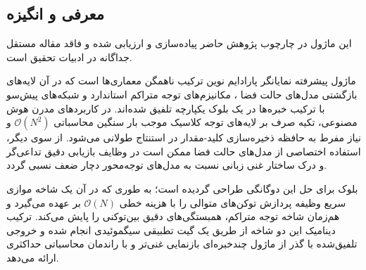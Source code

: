 \subsection{معرفی و انگیزه}
این ماژول در چارچوب پژوهش حاضر پیاده‌سازی و ارزیابی شده و فاقد مقاله مستقل جداگانه در ادبیات تحقیق است.

ماژول پیشرفته  نمایانگر پارادایم نوین ترکیب ناهمگن معماری‌ها  است که در آن لایه‌های بازگشتی مدل‌های حالت فضا ، مکانیزم‌های توجه متراکم استاندارد  و شبکه‌های پیش‌سو با ترکیب خبره‌ها  در یک بلوک یکپارچه تلفیق شده‌اند. در کاربردهای مدرن هوش مصنوعی، تکیه صرف بر لایه‌های توجه کلاسیک موجب بار سنگین محاسباتی $\mathcal{O}(N^2)$ و نیاز مفرط به حافظه ذخیره‌سازی کلید-مقدار  در استنتاج طولانی می‌شود. از سوی دیگر، استفاده اختصاصی از مدل‌های حالت فضا ممکن است در وظایف بازیابی دقیق تداعی‌گر  و درک ساختار غنی زبانی نسبت به مدل‌های توجه‌محور دچار ضعف نسبی گردد.

بلوک  برای حل این دوگانگی طراحی گردیده است؛ به طوری که در آن یک شاخه موازی سریع  وظیفه پردازش توکن‌های متوالی را با هزینه خطی $\mathcal{O}(N)$ بر عهده می‌گیرد و هم‌زمان شاخه توجه متراکم، همبستگی‌های دقیق بین‌توکنی را پایش می‌کند. ترکیب دینامیک این دو شاخه از طریق یک گیت تطبیقی سیگموئیدی انجام شده و خروجی تلفیق‌شده با گذر از ماژول چندخبره‌ای  بازنمایی غنی‌تر و با راندمان محاسباتی حداکثری ارائه می‌دهد.
